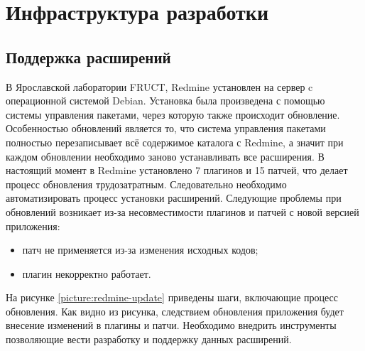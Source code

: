 \chapter{Инфраструктура разработки}
\section{Поддержка расширений}
В Ярославской лаборатории FRUCT, Redmine установлен на сервер c операционной
системой Debian. Установка была произведена с помощью системы управления
пакетами, через которую также происходит обновление. Особенностью обновлений
является то, что система управления пакетами полностью перезаписывает всё
содержимое каталога с Redmine, а значит при каждом обновлении необходимо заново
устанавливать все расширения. В настоящий момент в Redmine установлено 7
плагинов и 15 патчей, что делает процесс обновления трудозатратным.
Следовательно необходимо автоматизировать процесс установки расширений.
Следующие проблемы при обновлений возникает из-за несовместимости плагинов и
патчей с новой версией приложения:
\begin{itemize}
  \item патч не применяется из-за изменения исходных кодов;
  \item плагин некорректно работает.
\end{itemize}
На рисунке \ref{picture:redmine-update} приведены шаги, включающие процесс
обновления. Как видно из рисунка, следствием обновления приложения будет
внесение изменений в плагины и патчи. Необходимо внедрить инструменты
позволяющие вести разработку и поддержку данных расширений.


